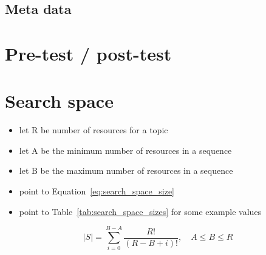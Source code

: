 \subsection{Meta data}
\section{Pre-test / post-test} %
\section{Search space}
\begin{itemize}
	\item let R be number of resources for a topic
	\item let A be the minimum number of resources in a sequence
	\item let B be the maximum number of resources in a sequence
	\item point to Equation~\eqref{eq:search_space_size}
	\item point to Table~\ref{tab:search_space_sizes} for some example values
\end{itemize}
\begin{equation}
	\label{eq:search_space_size}
	|S| = \sum_{i=0}^{B-A} \frac{R!}{(R-B+i)!}, \quad A \le B \le R
\end{equation}
